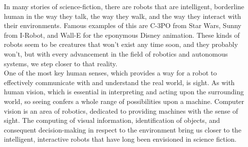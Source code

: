 

In many stories of science-fiction, there are robots that are intelligent, borderline human in the way they talk, the way they walk, and the way they interact with their environments. Famous examples of this are C-3PO from Star Wars, Sunny from I-Robot, and Wall-E for the eponymous Disney animation. These kinds of robots seem to be creatures that won't exist any time soon, and they probably won't, but with every advancement in the field of robotics and autonomous systems, we step closer to that reality.\\
One of the most key human senses, which provides a way for a robot to effectively communicate with and understand the real world, is sight. As with human vision, which is essential in interpreting and acting upon the surrounding world, so seeing confers a whole range of possibilities upon a machine. Computer vision is an area of robotics, dedicated to providing machines with the sense of sight. The computing of visual information, identification of objects, and consequent decision-making in respect to the environment bring us closer to the intelligent, interactive robots that have long been envisioned in science fiction.

